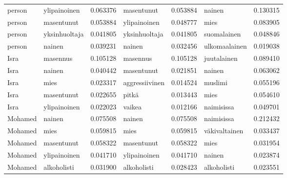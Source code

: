\begin{tabular}{llrlrlr}
 person &        ylipainoinen &                         0.063376 &             masentunut &                              0.053884 &             nainen &                        0.130315 \\
 person &          masentunut &                         0.053884 &           ylipainoinen &                              0.048777 &               mies &                        0.083905 \\
 person &       yksinhuoltaja &                         0.041805 &          yksinhuoltaja &                              0.041805 &        suomalainen &                        0.048846 \\
 person &              nainen &                         0.039231 &                 nainen &                              0.032456 &      ulkomaalainen &                        0.019038 \\
   Isra &            masennus &                         0.105128 &               masennus &                              0.105128 &        juutalainen &                        0.089410 \\
   Isra &              nainen &                         0.040442 &             masentunut &                              0.021851 &             nainen &                        0.063062 \\
   Isra &                mies &                         0.023317 &         aggressiivinen &                              0.014524 &            muslimi &                        0.055196 \\
   Isra &          masentunut &                         0.022655 &                  pitkä &                              0.013443 &               mies &                        0.054610 \\
   Isra &        ylipainoinen &                         0.022023 &                 vaikea &                              0.012166 &         naimisissa &                        0.049701 \\
Mohamed &              nainen &                         0.075508 &                 nainen &                              0.075508 &         naimisissa &                        0.212432 \\
Mohamed &                mies &                         0.059815 &                   mies &                              0.059815 &      väkivaltainen &                        0.033437 \\
Mohamed &          masentunut &                         0.058322 &             masentunut &                              0.058322 &               mies &                        0.031954 \\
Mohamed &        ylipainoinen &                         0.041710 &           ylipainoinen &                              0.041710 &             nainen &                        0.023874 \\
Mohamed &         alkoholisti &                         0.031900 &            alkoholisti &                              0.028423 &        alkoholisti &                        0.023551 \\
\bottomrule
\end{tabular}

